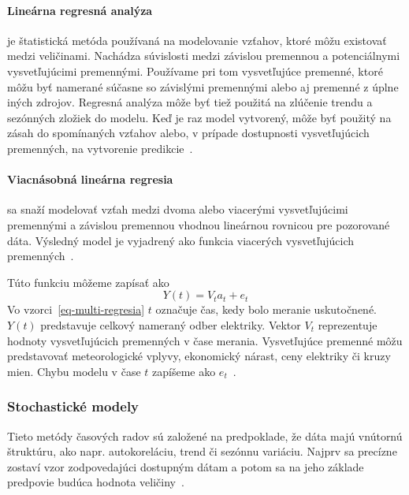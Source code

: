 \documentclass[a4paper,slovak,12pt,appendix]{article}
\begin{document}
\paragraph{Lineárna regresná analýza} je štatistická metóda používaná na
modelovanie vzťahov, ktoré môžu existovať medzi veličinami. Nachádza súvislosti
medzi závislou premennou a potenciálnymi vysvetľujúcimi premennými. Používame
pri tom vysvetľujúce premenné, ktoré môžu byť namerané súčasne so závislými
premennými alebo aj premenné z úplne iných zdrojov. Regresná analýza môže byť
tiež použitá na zlúčenie trendu a sezónných zložiek do modelu. Keď je raz model
vytvorený, môže byť použitý na zásah do spomínaných vzťahov alebo, v prípade
dostupnosti vysvetľujúcich premenných, na vytvorenie predikcie~\cite{Liu1992}.

\paragraph{Viacnásobná lineárna regresia} sa snaží modelovať vzťah medzi dvoma
alebo viacerými vysvetľujúcimi premennými a závislou premennou vhodnou
lineárnou rovnicou pre pozorované dáta. Výsledný model je vyjadrený ako funkcia
viacerých vysvetľujúcich premenných~\cite{Grmanova2016}.

Túto funkciu môžeme zapísať ako
\begin{equation}
  Y(t) = V_t a_t + e_t
  \label{eq-multi-regresia}
\end{equation}
Vo vzorci~\ref{eq-multi-regresia} $t$ označuje čas, kedy bolo meranie
uskutočnené. $Y(t)$ predstavuje celkový nameraný odber elektriky. Vektor $V_t$
reprezentuje hodnoty vysvetľujúcich premenných v čase merania. Vysvetľujúce
premenné môžu predstavovať meteorologické vplyvy, ekonomický nárast, ceny
elektriky či kruzy mien. Chybu modelu v čase $t$ zapíšeme
ako $e_t$~\cite{KumarSingh2013}.


\subsubsection{Stochastické modely}
Tieto metódy časových radov sú založené na predpoklade, že dáta majú vnútornú
štruktúru, ako napr. autokoreláciu, trend či sezónnu variáciu. Najprv sa
precízne zostaví vzor zodpovedajúci dostupným dátam a potom sa na jeho základe
predpovie budúca hodnota veličiny~\cite{KumarSingh2013}.
\end{document}
